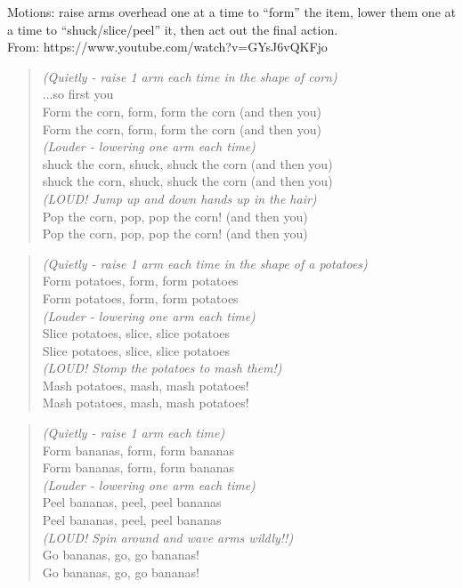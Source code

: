 Motions: raise arms overhead one at a time to “form” the item, lower them one at a time to “shuck/slice/peel” it, then act out the final action. \\

From: https://www.youtube.com/watch?v=GYsJ6vQKFjo


\begin{verse}
\textit{(Quietly - raise 1 arm each time in the shape of corn)}\\
...so first you \\
Form the corn, form, form the corn \quad (and then you)\\
Form the corn, form, form the corn \quad (and then you)\\
\bigskip
\textit{(Louder - lowering one arm each time)}\\
shuck the corn, shuck, shuck the corn \quad (and then you)\\
shuck the corn, shuck, shuck the corn \quad (and then you)\\
\bigskip
\textit{(LOUD! Jump up and down hands up in the hair)}\\
Pop the corn, pop, pop the corn! \quad (and then you)\\
Pop the corn, pop, pop the corn! \quad (and then you)\\
\end{verse}

\begin{verse}
\textit{(Quietly - raise 1 arm each time in the shape of a potatoes)}\\
Form potatoes, form, form potatoes \\
Form potatoes, form, form potatoes \\
\bigskip
\textit{(Louder - lowering one arm each time)}\\
Slice potatoes, slice, slice potatoes \\
Slice potatoes, slice, slice potatoes \\
\bigskip
\textit{(LOUD! Stomp the potatoes to mash them!)}\\
Mash potatoes, mash, mash potatoes!\\
Mash potatoes, mash, mash potatoes!\\
\end{verse}

\begin{verse}
\textit{(Quietly - raise 1 arm each time)}\\
Form bananas, form, form bananas \\
Form bananas, form, form bananas \\
\bigskip
\textit{(Louder - lowering one arm each time)}\\
Peel bananas, peel, peel bananas \\
Peel bananas, peel, peel bananas \\
\bigskip
\textit{(LOUD! Spin around and wave arms wildly!!)}\\
Go bananas, go, go bananas!\\
Go bananas, go, go bananas!\\
\end{verse}
